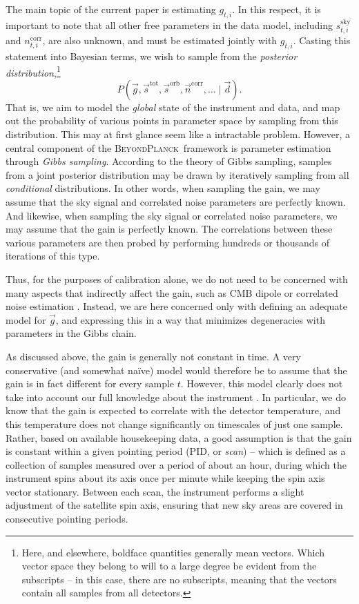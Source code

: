 \documentclass[twocolumn]{aa}
\renewcommand{\d}[0]{\vec{d}}
\newcommand{\n}[0]{\vec{n}}
\newcommand{\s}[0]{\vec{s}}
\newcommand{\g}[0]{\vec{g}}
\newcommand{\BP}{\textsc{BeyondPlanck}}
\newcommand{\ti}[0]{_{t, i}}
\newcommand{\tot}[0]{^{\mathrm{tot}}}
\newcommand{\corr}[0]{^{\mathrm{corr}}}
\newcommand{\sky}[0]{^{\mathrm{sky}}}
\newcommand{\orb}[0]{^{\mathrm{orb}}}
\begin{document}
The main topic of the current paper is estimating $g\ti$. In this respect, it is important to note that all other free parameters in the data model, including $s\ti\sky$ and $n\ti\corr$, are also unknown, and must be estimated jointly with $g\ti$. Casting this statement into Bayesian terms, we wish to sample from the \emph{posterior distribution},\footnote{Here, and elsewhere, boldface quantities generally mean vectors. Which vector space they belong to will to a large degree be evident from the subscripts -- in this case, there are no subscripts, meaning that the vectors contain all samples from all detectors.}
\begin{equation}
    P(\g, \s\tot, \s\orb, \n\corr, \ldots \mid \d).
\end{equation}
That is, we aim to model the \emph{global} state of the instrument and data, and map out the probability of various points in parameter space by sampling from this distribution. This may at first glance seem like a intractable problem. However, a central component of the \BP\ framework is parameter estimation through \emph{Gibbs sampling}. According to the theory of Gibbs sampling, samples from a joint posterior distribution may be drawn by iteratively sampling from all \emph{conditional} distributions. In other words, when sampling the gain, we may assume that the sky signal and correlated noise parameters are perfectly known. And likewise, when sampling the sky signal or correlated noise parameters, we may assume that the gain is perfectly known. The correlations between these various parameters are then probed by performing hundreds or thousands of iterations of this type. 

Thus, for the purposes of calibration alone, we do not need to be
concerned with many aspects that indirectly affect the gain, such as
CMB dipole or correlated noise estimation
\citep{planck2013-p02,planck2014-a06,planck2016-l02}. Instead, we are
here concerned only with defining an adequate model for $\g$, and
expressing this in a way that minimizes degeneracies with parameters
in the Gibbs chain. 

As discussed above, the gain is generally not constant in time. A very conservative (and somewhat na\"ive) model would therefore be to assume that the gain is in fact different for every sample $t$. However, this model clearly does not take into account our full knowledge about the instrument \citep{planck2013-p05}. In particular, we do know that the gain is expected to correlate with the detector temperature, and this temperature does not change significantly on timescales of just one sample. Rather, based on available housekeeping data, a good assumption is that the gain is constant within a given pointing period (PID, or \emph{scan}) -- which is defined as a collection of samples measured over a period of about an hour, during which the instrument spins about its axis once per minute while keeping the spin axis vector stationary. Between each scan, the instrument performs a slight adjustment of the satellite spin axis, ensuring that new sky areas are covered in consecutive pointing periods. 
\end{document}
